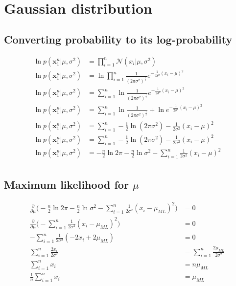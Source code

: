 \chapter{Gaussian distribution}
\section{Converting probability to its log-probability}\label{AP:log_prob}
\begin{equation}\label{eq:ap_logprob}
\begin{split}
    \ln p(\textbf{x}^n_1 | \mu, \sigma^2) &= \prod_{i=1}^{n}{\mathcal{N}(x_i|\mu, \sigma^2)}\\
    \ln p(\textbf{x}^n_1 | \mu, \sigma^2) &= \ln \prod_{i=1}^{n}\frac{1}{(2 \pi \sigma ^2)^{\frac{1}{2}}} e^{- \frac{1}{2\sigma ^2}(x_i - \mu)^2}\\
    \ln p(\textbf{x}^n_1 | \mu, \sigma^2) &= \sum_{i=1}^{n} \ln \frac{1}{(2 \pi \sigma ^2)^{\frac{1}{2}}} e^{- \frac{1}{2\sigma ^2}(x_i - \mu)^2}\\
    \ln p(\textbf{x}^n_1 | \mu, \sigma^2) &= \sum_{i=1}^{n} \ln \frac{1}{(2 \pi \sigma ^2)^{\frac{1}{2}}} + \ln e^{- \frac{1}{2\sigma ^2}(x_i - \mu)^2}\\
    \ln p(\textbf{x}^n_1 | \mu, \sigma^2) &= \sum_{i=1}^{n} -\frac{1}{2} \ln (2 \pi \sigma ^2) - \frac{1}{2\sigma ^2}(x_i - \mu)^2\\
    \ln p(\textbf{x}^n_1 | \mu, \sigma^2) &= \sum_{i=1}^{n} -\frac{1}{2} \ln (2 \pi \sigma ^2) - \frac{1}{2\sigma ^2}(x_i - \mu)^2\\
    \ln p(\textbf{x}^n_1 | \mu, \sigma^2) &= -\frac{n}{2} \ln 2 \pi -\frac{n}{2} \ln \sigma ^2 - \sum_{i=1}^{n} \frac{1}{2\sigma ^2}(x_i - \mu)^2\\
\end{split}
\end{equation}

\section{Maximum likelihood for \texorpdfstring{$\mu$}{the mean}}\label{AP:mu_ML}
\begin{equation}\label{eq:ap_derivative_mu}
\begin{split}
    \frac{\partial }{\partial \mu } \big( - \frac{n}{2} \ln{2 \pi} - \frac{n}{2} \ln{\sigma ^2} - \sum_{i=1}^{n} \frac{1}{2\sigma ^2}(x_i - \mu_{ML})^2 \big) &= 0\\
    \frac{\partial}{\partial \mu} \big( - \sum_{i=1}^{n} \frac{1}{2\sigma ^2}(x_i - \mu_{ML})^2 \big) &= 0\\
    - \sum_{i=1}^{n} \frac{1}{2\sigma ^2}(-2 x_i + 2 \mu_{ML}) &= 0\\
    \sum_{i=1}^{n} \frac{2 x_i}{2\sigma ^2} &= \sum_{i=1}^{n} \frac{2 \mu_{ML}}{2\sigma ^2}\\
    \sum_{i=1}^{n} x_i &= n \mu_{ML}\\
    \frac{1}{n} \sum_{i=1}^{n} x_i &= \mu_{ML}\\
\end{split}
\end{equation}


